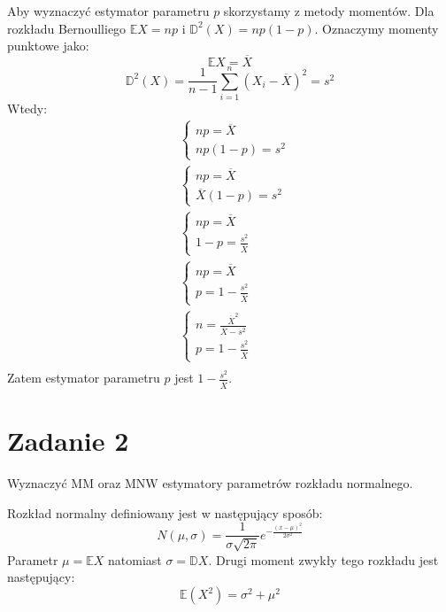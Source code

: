 \documentclass{article}
\begin{document}
Aby wyznaczyć estymator parametru $p$ skorzystamy z metody momentów. Dla rozkładu Bernoulliego $\mathbb{E}X = np$ i $\mathbb{D}^2(X) = np(1-p)$. Oznaczymy momenty punktowe jako:
\[ \mathbb{E}X = \overline{X} \]
\[ \mathbb{D}^2(X) = \frac{1}{n-1}\sum_{i=1}^n(X_i-\overline{X})^2 = s^2\]
Wtedy:
\begin{align*}
&\left\{
\begin{array}{l} np = \overline{X} \\ np(1-p) = s^2 \end{array} \right. \\ %
&\left\{
\begin{array}{l} np = \overline{X} \\ \overline{X}(1-p) = s^2 \end{array} \right. \\ %
&\left\{
\begin{array}{l} np = \overline{X} \\ 1-p = \frac{s^2}{\overline{X}} \end{array} \right. \\ %
&\left\{
\begin{array}{l} np = \overline{X} \\ p =1 - \frac{s^2}{\overline{X}} \end{array} \right. \\ %
&\left\{
\begin{array}{l} n = \frac{\overline{X}^2}{\overline{X}-s^2} \\ p = 1 - \frac{s^2}{\overline{X}} \end{array} \right. \\ %
\end{align*}
Zatem estymator parametru $p$ jest $1 - \frac{s^2}{\overline{X}}$.

\newpage
\section{Zadanie 2}
Wyznaczyć MM oraz MNW estymatory parametrów rozkładu normalnego. \\ \par

Rozkład normalny definiowany jest w następujący sposób:
\[ N(\mu,\sigma)  = \frac{1}{\sigma\sqrt{2\pi}}e^{-\frac{(x-\mu)^2}{2\sigma^2}} \]
Parametr $\mu = \mathbb{E}X$ natomiast $\sigma = \mathbb{D}X$. Drugi moment zwykły tego rozkładu jest następujący:
\[ \mathbb{E}(X^2) = \sigma^2 + \mu^2 \]
\end{document}
